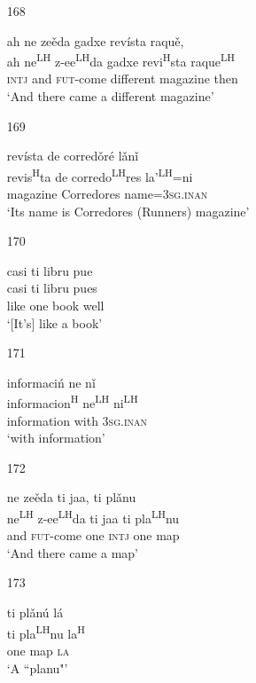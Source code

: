 \begin{itemize}
\item[168]
 
\glll   ah ne ze\v{e}da gadxe rev\'{i}sta raqu\v{e},  \\
ah ne\textsuperscript{LH} z-ee\textsuperscript{LH}da gadxe revi\textsuperscript{H}sta raque\textsuperscript{LH} \\
\textsc{intj} and \textsc{fut}-come different magazine then \\
\glt `And there came a different magazine'
 


\item[169]
 
\glll   rev\'{i}sta de corred\v{o}r\'{e} l\v{a}n\v{i} \\
revis\textsuperscript{H}ta de corredo\textsuperscript{LH}res la'\textsuperscript{LH}=ni \\
magazine Corredores name=\textsc{3sg.inan} \\
\glt `Its name is Corredores (Runners) magazine'
 


\item[170]
 
\glll   casi ti libru pue \\
 casi ti libru pues \\
like one book well \\
\glt `[It's] like a book'
 

\item[171]
 
\glll   informaci\'{n} ne n\v{i} \\
informacion\textsuperscript{H} ne\textsuperscript{LH} ni\textsuperscript{LH} \\
information with \textsc{3sg.inan} \\
\glt `with information'
 

\item[172]

\glll   ne ze\v{e}da ti jaa, ti pl\v{a}nu \\
ne\textsuperscript{LH} z-ee\textsuperscript{LH}da  ti jaa ti pla\textsuperscript{LH}nu \\
and \textsc{fut}-come one \textsc{intj} one map \\
\glt `And there came a map'
 

\item[173]
 
\glll   ti pl\v{a}n\'{u} l\'{a} \\
 ti pla\textsuperscript{LH}nu la\textsuperscript{H} \\
one map \textsc{la} \\
\glt `A ``planu"'
 



\end{itemize}
